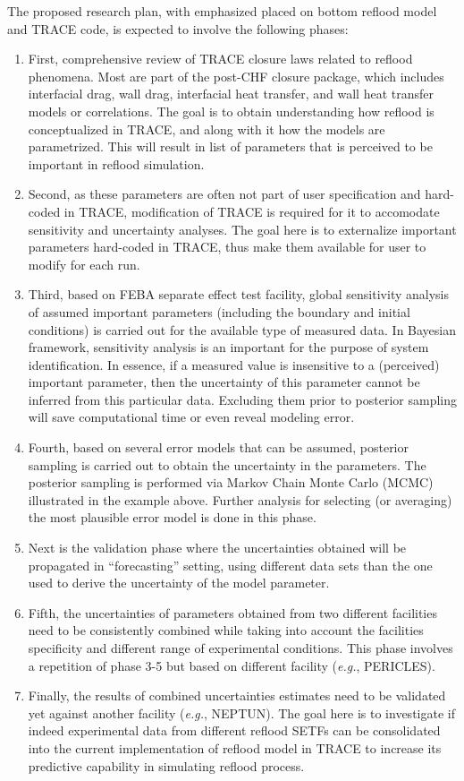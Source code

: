 \documentclass[11pt,titlepage]{article}
\begin{document}
The proposed research plan, with emphasized placed on bottom reflood model and TRACE code, is expected to involve the following phases:
\begin{enumerate}
    \item First, comprehensive review of TRACE closure laws related to reflood phenomena. 
    Most are part of the post-CHF closure package, which includes interfacial drag, wall drag, interfacial heat transfer, and wall heat transfer models or correlations. 
    The goal is to obtain understanding how reflood is conceptualized in TRACE, and along with it how the models are parametrized. 
    This will result in list of parameters that is perceived to be important in reflood simulation.
    \item Second, as these parameters are often not part of user specification and hard-coded in TRACE, modification of TRACE is required for it to accomodate sensitivity and uncertainty analyses. 
    The goal here is to externalize important parameters hard-coded in TRACE, thus make them available for user to modify for each run.  
    \item Third, based on FEBA separate effect test facility, global sensitivity analysis of assumed important parameters (including the boundary and initial conditions) is carried out for the available type of measured data. 
    In Bayesian framework, sensitivity analysis is an important for the purpose of system identification. 
    In essence, if a measured value is insensitive to a (perceived) important parameter, then the uncertainty of this parameter cannot be inferred from this particular data. 
    Excluding them prior to posterior sampling will save computational time or even reveal modeling error.
    \item Fourth, based on several error models that can be assumed, posterior sampling is carried out to obtain the uncertainty in the parameters. 
    The posterior sampling is performed via Markov Chain Monte Carlo (MCMC) illustrated in the example above. 
    Further analysis for selecting (or averaging) the most plausible error model is done in this phase.
    \item Next is the validation phase where the uncertainties obtained will be propagated in ``forecasting'' setting, using different data sets than the one used to derive the uncertainty of the model parameter. 
    \item Fifth, the uncertainties of parameters obtained from two different facilities need to be consistently combined while taking into account the facilities specificity and different range of experimental conditions. 
    This phase involves a repetition of phase 3-5 but based on different facility (\textit{e.g.}, PERICLES). 
    \item Finally, the results of combined uncertainties estimates need to be validated yet against another facility (\textit{e.g.}, NEPTUN). 
    The goal here is to investigate if indeed experimental data from different reflood SETFs can be consolidated into the current implementation of reflood model in TRACE to increase its predictive capability in simulating reflood process.
\end{enumerate}
\end{document}
